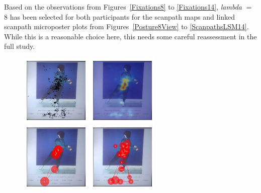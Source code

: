 \documentclass[11pt]{asaproc}
\begin{document}
Based on the observations from Figures~\ref{Fixations8} to \ref{Fixations14},
{\it lambda} $=$ 8 has been selected for both participants
for the scanpath maps and linked scanpath microposter plots from Figures~\ref{Posture8View} to \ref{ScanpathsLSM14}.
While this is a reasonable
choice here, this needs some careful reassessment in the full study.


\begin{figure}[t]
\begin{center} 
\includegraphics[width=0.30\textwidth]{figures/Subject13_scatterplot_posture17.jpg} \hspace{1pt}
\includegraphics[width=0.30\textwidth]{figures/Subject13_heatmap_posture17_new.jpg} \\
\includegraphics[width=0.30\textwidth]{figures/Subject13_scanpath_posture17_lambda_1.jpg} \hspace{1pt}
\includegraphics[width=0.30\textwidth]{figures/Subject13_scanpath_posture17_lambda_2.jpg} \\

\end{center}
\end{figure}
\end{document}
